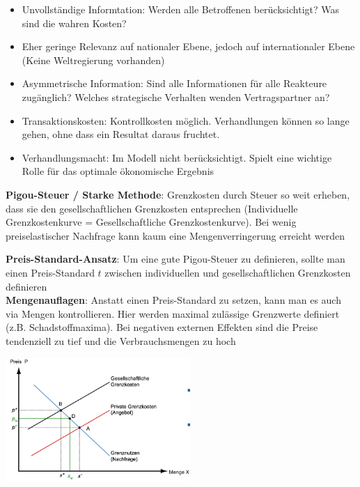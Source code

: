 \documentclass[9pt, landscape, fleqn]{scrartcl}
\begin{document}
\begin{multicols*}{3}
\begin{itemize}
    \item Unvollständige Informtation: Werden alle Betroffenen berücksichtigt? Was sind die wahren Kosten?
    \item Eher geringe Relevanz auf nationaler Ebene, jedoch auf internationaler Ebene (Keine Weltregierung vorhanden)
    \item Asymmetrische Information: Sind alle Informationen für alle Reakteure zugänglich? Welches strategische Verhalten wenden Vertragspartner an?
    \item Transaktionskosten: Kontrollkosten möglich. Verhandlungen können so lange gehen, ohne dass ein Resultat daraus fruchtet.
    \item Verhandlungsmacht: Im Modell nicht berücksichtigt. Spielt eine wichtige Rolle für das optimale ökonomische Ergebnis 
\end{itemize}

\textbf{Pigou-Steuer / Starke Methode}: Grenzkosten durch Steuer so weit erheben, dass sie den gesellschaftlichen Grenzkosten entsprechen (Individuelle Grenzkostenkurve = Gesellschaftliche Grenzkostenkurve). Bei wenig preiselastischer Nachfrage kann kaum eine Mengenverringerung erreicht werden \newline 

\textbf{Preis-Standard-Ansatz}: Um eine gute Pigou-Steuer zu definieren, sollte man einen Preis-Standard $t$ zwischen individuellen und gesellschaftlichen Grenzkosten definieren \\

\textbf{Mengenauflagen}: Anstatt einen Preis-Standard zu setzen, kann man es auch via Mengen kontrollieren. Hier werden maximal zulässige Grenzwerte definiert (z.B. Schadstoffmaxima). Bei negativen externen Effekten sind die Preise tendenziell zu tief und die Verbrauchsmengen zu hoch

\begin{center}
    \includegraphics[width=7cm]{Mengenregulierung.png}
\end{center}


\end{multicols*}
\end{document}
